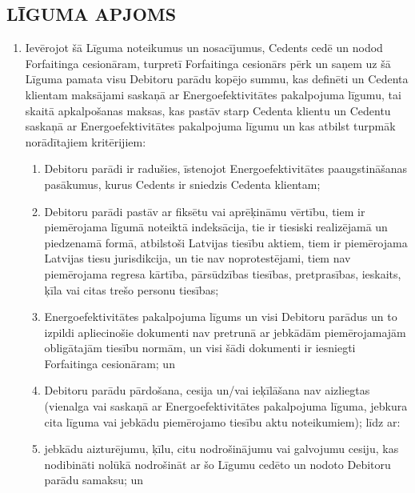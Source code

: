 \documentclass[a4paper]{article}
\begin{document}
\vspace{5mm}

\subsection{LĪGUMA APJOMS}

\vspace{2mm}

\begin{enumerate}
\item{Ievērojot šā Līguma noteikumus un nosacījumus, Cedents cedē un nodod Forfaitinga
cesionāram, turpretī Forfaitinga cesionārs pērk un saņem uz šā Līguma pamata visu
Debitoru parādu kopējo summu, kas definēti un Cedenta klientam maksājami saskaņā ar
Energoefektivitātes pakalpojuma līgumu, tai skaitā apkalpošanas maksas, kas pastāv
starp Cedenta klientu un Cedentu saskaņā ar Energoefektivitātes pakalpojuma līgumu un
kas atbilst turpmāk norādītajiem kritērijiem:}

  \begin{enumerate}
  \item{Debitoru parādi ir radušies, īstenojot Energoefektivitātes paaugstināšanas
pasākumus, kurus Cedents ir sniedzis Cedenta klientam;}

  \item{Debitoru parādi pastāv ar fiksētu vai aprēķināmu vērtību, tiem ir piemērojama
līgumā noteiktā indeksācija, tie ir tiesiski realizējamā un piedzenamā formā,
atbilstoši Latvijas tiesību aktiem, tiem ir piemērojama Latvijas tiesu jurisdikcija, un
tie nav noprotestējami, tiem nav piemērojama regresa kārtība, pārsūdzības
tiesības, pretprasības, ieskaits, ķīla vai citas trešo personu tiesības;}

  \item{Energoefektivitātes pakalpojuma līgums un visi Debitoru parādus un to izpildi
apliecinošie dokumenti nav pretrunā ar jebkādām piemērojamajām obligātajām
tiesību normām, un visi šādi dokumenti ir iesniegti Forfaitinga cesionāram; un}

  \item{Debitoru parādu pārdošana, cesija un/vai ieķīlāšana nav aizliegtas (vienalga vai
saskaņā ar Energoefektivitātes pakalpojuma līguma, jebkura cita līguma vai
jebkādu piemērojamo tiesību aktu noteikumiem);
līdz ar:}

  \item{jebkādu aizturējumu, ķīlu, citu nodrošinājumu vai galvojumu cesiju, kas nodibināti
nolūkā nodrošināt ar šo Līgumu cedēto un nodoto Debitoru parādu samaksu; un}


\end{enumerate}
\end{enumerate}
\end{document}
